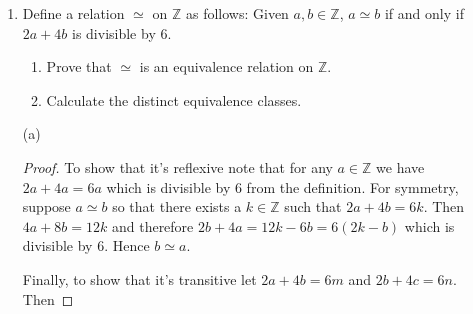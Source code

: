 \documentclass[12pt]{article}
\begin{document}
{\begin{enumerate}
(a)

\begin{proof}
  To show that $\simeq$ is reflexive consider any $(a,b)\in \mathbb R\times \mathbb R$.  Since $a^2+b^2=a^2+b^2$ trivially then $(a,b)\simeq (a,b)$.

  To show that $\simeq$ is symmetric let $(a,b)\simeq (c,d)$.  Then $a^2+b^2=c^2+d^2$ and by the symmetry of $=$ we have that $c^2+d^2=a^2+b^2$.  Then $(c,d)\simeq (a,b)$.

  To show that it is transitive let $(a,b)\simeq (c,d)$ and $(c,d)\simeq (e,f)$.  Then

  \begin{align*}
    a^2+b^2=c^2+d^2=e^2+f^2
  \end{align*}

  which shows that $(a,b)\simeq (e,f)$.

  Since the relation is reflexive, symmetric, and transitive then it's an equivalence relation.  (Indeed any relation defined in terms of equality like this will be an equivalence relation, since reflexivity, symmetry, and transitivity all inherit from the properties of the equality!)
\end{proof}

(b)

  If $a^2+b^2=r^2$ for some real number $r$, and also $c^2+d^2=r^2$ then these are two points on the circle of radius $r$ centered at the origin.  The equivalence class of $(a,b)$ is then the circle of radius $\sqrt{a^2+b^2}$.

\item Define a relation $\simeq$ on $\mathbb{Z}$ as follows: Given $a, b \in \mathbb{Z}$, $a \simeq b$ if and only if $2a + 4b$ is divisible by 6.
\begin{enumerate}
\item Prove that $\simeq$ is an equivalence relation on $\mathbb{Z}$.
\item Calculate the distinct equivalence classes.
\end{enumerate}

(a)

\begin{proof}
  To show that it's reflexive note that for any $a\in \mathbb Z$ we have $2a+4a=6a$ which is divisible by 6 from the definition.  For symmetry, suppose $a\simeq b$ so that there exists a $k\in\mathbb Z$ such that $2a+4b=6k$.  Then $4a+8b=12k$ and therefore $2b+4a=12k-6b=6(2k-b)$ which is divisible by 6.  Hence $b\simeq a$.

  Finally, to show that it's transitive let $2a+4b=6m$ and $2b+4c=6n$.  Then


\end{proof}
\end{enumerate}}
\end{document}
